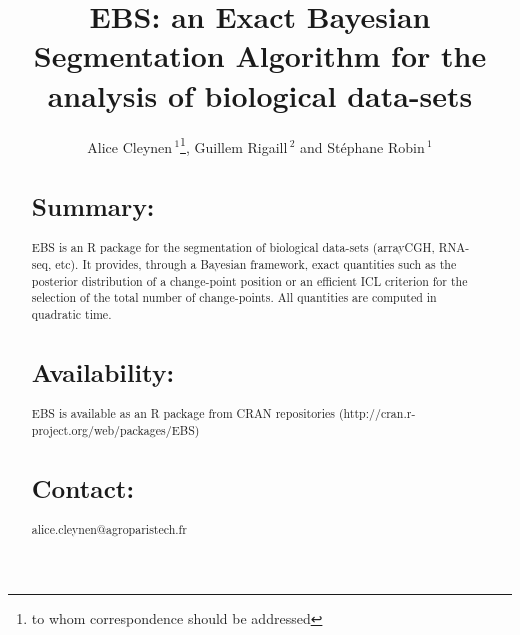 \documentclass{bioinfo}
\begin{document}

\title[short Title]{EBS: an Exact Bayesian Segmentation Algorithm for
  the analysis of biological data-sets}

\author[Sample \textit{et~al}]{Alice Cleynen\,$^{1}$\footnote{to whom correspondence should be addressed}, Guillem
  Rigaill\,$^{2}$ and St\'{e}phane Robin\,$^{1}$}



\address{$^{1}$AgroParisTech, 16 rue Claude Bernard, 75231 Paris Cedex
  05, France \\ 
$^{2}$URGV, INRA-CNRS-Univ. Evry, 2 Rue Gaston
  Cr\'{e}mieux, 91057 Evry Cedex, France}



\maketitle


\begin{abstract}

\section{Summary:}
 EBS is an R package for the segmentation of biological data-sets
 (arrayCGH, RNA-seq, etc). It provides, through a Bayesian framework,
 exact quantities such as the posterior distribution of a change-point
 position or an efficient ICL criterion for the selection of the total
 number of change-points. All quantities are computed in quadratic
 time.


\section{Availability:}
EBS is available as an R package from CRAN repositories
(http://cran.r-project.org/web/packages/EBS)


\section{Contact:} alice.cleynen@agroparistech.fr
\end{abstract}
\end{document}
